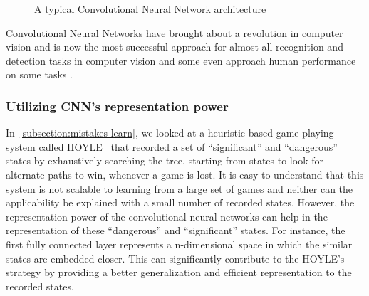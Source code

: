 \begin{figure}[H]
\caption{A typical Convolutional Neural Network architecture}			
\end{figure}		
		
Convolutional Neural Networks have brought about a revolution in computer 
vision and is now the most successful approach for almost all recognition and 
detection tasks in computer vision 
\cite{krizhevsky2012imagenet,tompson2014efficient,taigman2014deepface} 
and some even approach human performance on some tasks 
\cite{ciresan2012multi}.\\

\subsubsection{Utilizing CNN's representation power}
\label{subsection:representation-discussion-cnn}
In~\ref{subsection:mistakes-learn}, we looked at a heuristic based game playing 
system called 
HOYLE~\cite{epstein-01_learning-to-play-expertly-tutorial-on-hoyle} that 
recorded a set of ``significant'' and ``dangerous'' states by exhaustively 
searching the tree, starting from states to look for alternate paths to win, 
whenever a game is lost. It is easy to understand that this system is not 
scalable to learning from a large set of games and neither can the applicability 
be explained with a small number of recorded states. However, the 
representation power of the convolutional neural networks can help in the 
representation of these ``dangerous'' and ``significant'' states. For instance, 
the first fully connected layer represents a n-dimensional space in which the 
similar states are embedded closer. This can significantly contribute to the 
HOYLE's strategy by providing a better generalization and efficient 
representation to the recorded states.


